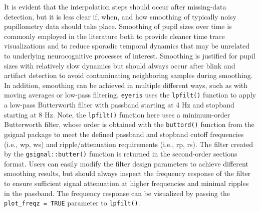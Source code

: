 It is evident that the interpolation steps should occur after missing-data detection, but it is less clear if, when, and how smoothing of typically noisy pupillometry data should take place. Smoothing of pupil sizes over time is commonly employed in the literature \parencite{steinhauer2022publication} both to provide cleaner time trace visualizations and to reduce sporadic temporal dynamics that may be unrelated to underlying neurocognitive processes of interest. Smoothing is justified for pupil sizes with relatively slow dynamics but should always occur after blink and artifact detection to avoid contaminating neighboring samples during smoothing. In addition, smoothing can be achieved in multiple different ways, such as with moving averages or low-pass filtering. \texttt{eyeris} uses the \texttt{lpfilt()} function to apply a low-pass Butterworth filter with passband starting at 4 Hz and stopband starting at 8 Hz. Note, the \texttt{lpfilt()} function here uses a minimum-order Butterworth filter, whose order is obtained with the \texttt{buttord()} function from the gsignal package \parencite{vanboxtel2021gsignal} to meet the defined passband and stopband cutoff frequencies (i.e., wp, ws) and ripple/attenuation requirements (i.e., rp, rs). The filter created by the \texttt{gsignal::butter()} function is returned in the second-order sections format. Users can easily modify the filter design parameters to achieve different smoothing results, but should always inspect the frequency response of the filter to ensure sufficient signal attenuation at higher frequencies and minimal ripples in the passband. The frequency response can be visualized by passing the \texttt{plot\_freqz = TRUE} parameter to \texttt{lpfilt()}.

